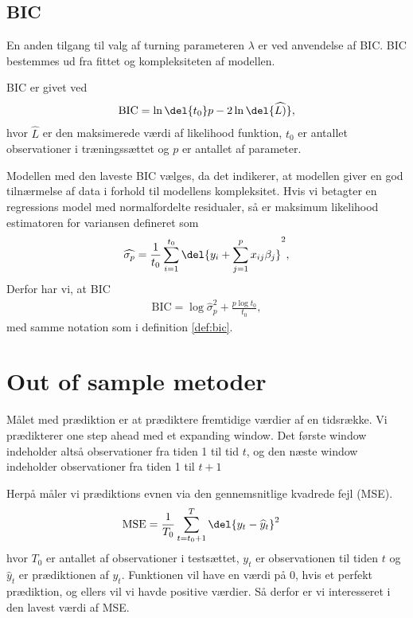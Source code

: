 \subsection{BIC}
En anden tilgang til valg af turning parameteren $\lambda$ er ved anvendelse af BIC.
BIC bestemmes ud fra fittet og kompleksiteten af modellen. 
\begin{defn}\label{def:bic}
BIC er givet ved
\begin{align*}
\text{BIC} = \ln\del{t_0}p - 2 \ln\del{\widehat{L)}}, 
\end{align*}
hvor $\widehat{L}$ er den maksimerede værdi af likelihood funktion, $t_0$ er antallet observationer i træningssættet og $p$ er antallet af parameter.
\end{defn} 
Modellen med den laveste BIC vælges, da det indikerer, at modellen giver en god tilnærmelse af data i forhold til modellens kompleksitet. 
Hvis vi betagter en regressions model med normalfordelte residualer, så er maksimum likelihood estimatoren for variansen defineret som
\begin{align*}
\widehat{\sigma_p} = \frac{1}{t_0} \sum_{i=1}^{t_0} \del{y_i + \sum_{j=1}^p x_{ij}\beta_j}^2,
\end{align*}
Derfor har vi, at BIC 
\begin{align*}
\text{BIC} = \log \widehat{\sigma}^2_p + \frac{p \log t_0}{t_0},
\end{align*}
med samme notation som i definition  \ref{def:bic}.

\section{Out of sample metoder}
Målet med prædiktion er at prædiktere fremtidige værdier af en tidsrække. 
Vi prædikterer one step ahead med et expanding window. 
Det første window indeholder altså observationer fra tiden 1 til tid $t$, og den næste window indeholder observationer fra tiden 1 til $t+1$



Herpå måler vi prædiktions evnen via den gennemsnitlige kvadrede fejl (MSE). 
\begin{align}
\text{MSE} & =  \frac{1}{T_0} \sum_{t=t_0 +1 }^{T} \del{y_t - \widehat{y}_t}^2 
\end{align} 
hvor $T_0$ er antallet af observationer i testsættet, $y_t$ er observationen til tiden $t$ og $\widehat{y}_t$ er prædiktionen af $y_t$.
Funktionen vil have en værdi på 0, hvis et perfekt prædiktion, og ellers vil vi havde positive værdier. Så derfor er vi interesseret i den lavest værdi af MSE. 

